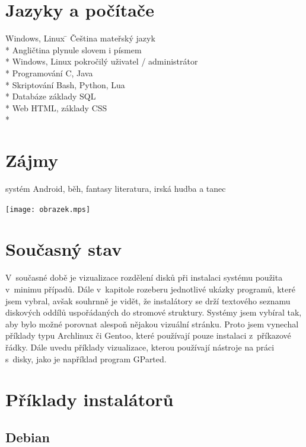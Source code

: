 \documentclass[a4paper]{article}
\begin{document}
\section*{Jazyky a počítače}
\begin{tabbing}
Windows, Linux \=					\kill
Čeština\> mateřský jazyk\\*
Angličtina\> plynule slovem i písmem\\*
Windows, Linux \>pokročilý uživatel / administrátor\\*
Programování\> C, Java\\*
Skriptování\> Bash, Python, Lua\\*
Databáze\> základy SQL\\*
Web\> HTML, základy CSS\\*
\end{tabbing}

\section*{Zájmy}
systém Android, běh, fantasy literatura, irská hudba a tanec

\texttt{[image: obrazek.mps]}
\maketitle
\section{Současný stav}

V~současné době je vizualizace rozdělení disků při instalaci systému použita v~minimu případů. Dále v~kapitole rozeberu jednotlivé ukázky programů, které jsem vybral, avšak souhrnně je vidět, 
že instalátory se drží textového seznamu diskových oddílů uspořádaných do stromové struktury. Systémy jsem vybíral tak, aby bylo možné porovnat alespoň nějakou vizuální stránku. Proto jsem vynechal
příklady typu Archlinux či Gentoo, které používají pouze instalaci z~příkazové řádky.  Dále uvedu příklady vizualizace, kterou používají nástroje na práci s~disky, jako je 
například program GParted.

\section{Příklady instalátorů}

\subsection{Debian}
\end{document}
